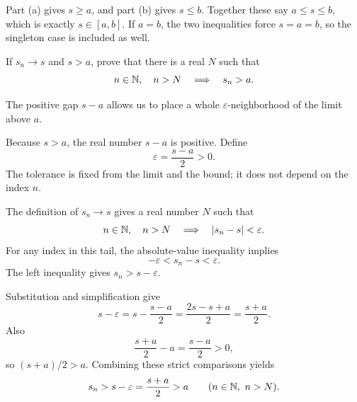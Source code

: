 Part (a) gives $s\ge a$, and part (b) gives $s\le b$.
Together these say $a\le s\le b$, which is exactly $s\in[a,b]$.
If $a=b$, the two inequalities force $s=a=b$, so the singleton case
is included as well.



\goal If $s_n\to s$ and $s>a$, prove that there is a real $N$ such that
\[
 n\in\mathbb{N},\quad n>N\quad\Longrightarrow\quad s_n>a.
\]

\idea The positive gap $s-a$ allows us to place a whole
$\varepsilon$-neighborhood of the limit above $a$.

Because $s>a$, the real number $s-a$ is positive. Define
\[
 \varepsilon=\frac{s-a}{2}>0.
\]
The tolerance is fixed from the limit and the bound; it does not depend
on the index $n$.

The definition of $s_n\to s$ gives a real number $N$ such that
\[
 n\in\mathbb{N},\quad n>N\quad\Longrightarrow\quad
 \left|s_n-s\right|<\varepsilon.
\]
For any index in this tail, the absolute-value inequality implies
\[
 -\varepsilon<s_n-s<\varepsilon.
\]
The left inequality gives $s_n>s-\varepsilon$.

Substitution and simplification give
\[
 s-\varepsilon
   =s-\frac{s-a}{2}
   =\frac{2s-s+a}{2}
   =\frac{s+a}{2}.
\]
Also
\[
 \frac{s+a}{2}-a=\frac{s-a}{2}>0,
\]
so $(s+a)/2>a$. Combining these strict comparisons yields
\[
 s_n>s-\varepsilon=\frac{s+a}{2}>a
 \qquad(n\in\mathbb{N},\ n>N).
\]

